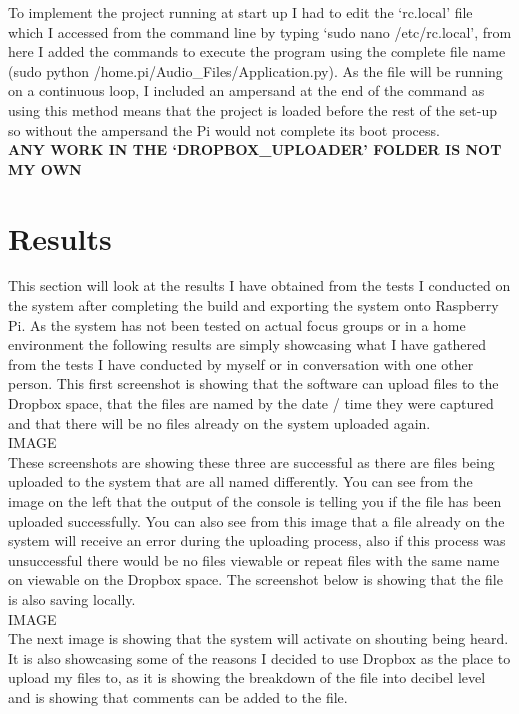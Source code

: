 \documentclass[a4paper,11pt]{report}
\begin{document}
To implement the project running at start up I had to edit the ‘rc.local’ file which I accessed from the command line by typing ‘sudo nano /etc/rc.local’, from here I added the commands to execute the program using the complete file name (sudo python /home.pi/Audio\_Files/Application.py). As the file will be running on a continuous loop, I included an ampersand at the end of the command as using this method means that the project is loaded before the rest of the set-up so without the ampersand the Pi would not complete its boot process.\\

\textbf{ANY WORK IN THE ‘DROPBOX\_UPLOADER’ FOLDER IS NOT MY OWN}
	
\section{Results}
This section will look at the results I have obtained from the tests I conducted on the system after completing the build and exporting the system onto Raspberry Pi. As the system has not been tested on actual focus groups or in a home environment the following results are simply showcasing what I have gathered from the tests I have conducted by myself or in conversation with one other person. This first screenshot is showing that the software can upload files to the Dropbox space, that the files are named by the date / time they were captured and that there will be no files already on the system uploaded again.\\

IMAGE\\

These screenshots are showing these three are successful as there are files being uploaded to the system that are all named differently. You can see from the image on the left that the output of the console is telling you if the file has been uploaded successfully. You can also see from this image that a file already on the system will receive an error during the uploading process, also if this process was unsuccessful there would be no files viewable or repeat files with the same name on viewable on the Dropbox space. The screenshot below is showing that the file is also saving locally.\\

IMAGE\\

The next image is showing that the system will activate on shouting being heard. It is also showcasing some of the reasons I decided to use Dropbox as the place to upload my files to, as it is showing the breakdown of the file into decibel level and is showing that comments can be added to the file.\\
\end{document}
